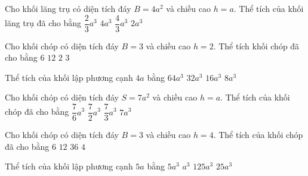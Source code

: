 \begin{ex}%
	Cho khối lăng trụ có diện tích đáy $B=4a^2$ và chiều cao $h=a$. Thể tích của khối lăng trụ đã  cho bằng
	 \choice
		 {$\dfrac{2}{3}a^3$}
		{\True  $4a^3$}
		{$\dfrac{4}{3}a^3$} 
		{$2a^3$} 
\end{ex}

\begin{ex}%
	Cho khối chóp  có diện tích đáy $B=3$ và chiều cao $h=2$. Thể tích khối chóp đã cho bằng
	\choice 
		 {$6$}
		 {$12$}
		{\True  $2$}
		 {$3$}
\end{ex}

\begin{ex}%
	Thể tích của khối  lập phương cạnh $4a$ bằng
	 \choice
		 {\True $64a^3$}
		{$32a^3$} 
		{$16a^3$} 
		{$8a^3$} 
\end{ex}

\begin{ex}%
	Cho khối chóp có diện tích đáy $S=7a^2$  và chiều cao $h=a$. Thể tích của khối chóp đã cho bằng
	\choice 
		 {$\dfrac{7}{6}{a^3}$}
		{$\dfrac{7}{2}{a^3}$} 
		{\True $\dfrac{7}{3}{a^3}$} 
		 {$ 7a^3$}
\end{ex}

\begin{ex}%
	 Cho khối chóp có diện tích đáy $B=3$ và chiều cao $h=4$. Thể tích của khối chóp đã cho bằng
	 \choice
		{$6$} 
		{$12$} 
		 {$36$}
		{\True $4$} 
\end{ex}

\begin{ex}%
	Thể tích  của khối lập phương cạnh $5a$ bằng
	\choice 
		{$5a^3$} 
		 {$a^3$}
		{\True $125a^3$} 
		 {$25a^3$}
\end{ex}

